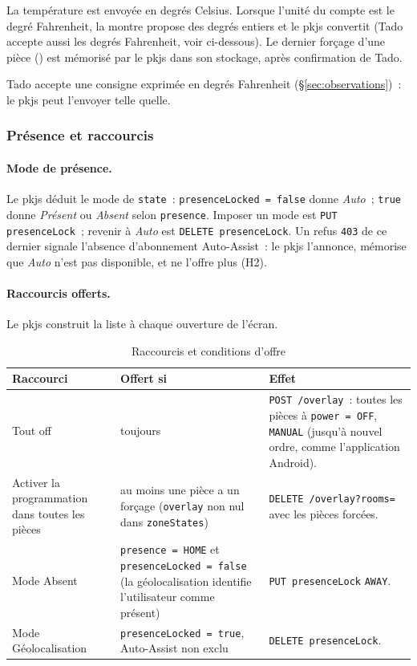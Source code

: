 La température est envoyée en degrés Celsius. Lorsque l'unité du compte est le degré
Fahrenheit, la montre propose des degrés entiers et le pkjs convertit (Tado accepte aussi les degrés Fahrenheit, voir ci-dessous). Le dernier forçage d'une pièce () est mémorisé par le pkjs
dans son stockage, après confirmation de Tado.

Tado accepte une consigne exprimée en degrés Fahrenheit (§\ref{sec:observations})~: le pkjs peut l'envoyer telle quelle.

\subsubsection{Présence et raccourcis}
\label{sec:presence}

\paragraph{Mode de présence.} Le pkjs déduit le mode de \texttt{state}~:
\texttt{presenceLocked = false} donne \emph{Auto}~; \texttt{true} donne \emph{Présent} ou
\emph{Absent} selon \texttt{presence}. Imposer un mode est \texttt{PUT presenceLock}~; revenir à
\emph{Auto} est \texttt{DELETE presenceLock}. Un refus \texttt{403} de ce dernier signale l'absence
d'abonnement Auto-Assist~: le pkjs l'annonce, mémorise que \emph{Auto} n'est pas
disponible, et ne l'offre plus (H2).

\paragraph{Raccourcis offerts.} Le pkjs construit la liste à chaque ouverture de l'écran.

\begin{table}[H]
  \centering\small
  \begin{tabularx}{\linewidth}{@{}>{\raggedright\arraybackslash}p{40mm}>{\raggedright\arraybackslash}p{50mm}X@{}}
    \toprule
    \textbf{Raccourci} & \textbf{Offert si} & \textbf{Effet} \\
    \midrule
    Tout off & toujours & \texttt{POST /overlay}~: toutes les pièces à \texttt{power = OFF}, \texttt{MANUAL} (jusqu'à nouvel ordre, comme l'application Android). \\
    Activer la programmation dans toutes les pièces & au moins une pièce a un forçage (\texttt{overlay} non nul dans \texttt{zoneStates}) & \texttt{DELETE /overlay?rooms=} avec les pièces forcées. \\
    Mode Absent & \texttt{presence = HOME} et \texttt{presenceLocked = false} (la géolocalisation identifie l'utilisateur comme présent) & \texttt{PUT presenceLock} \texttt{AWAY}. \\
    Mode Géolocalisation & \texttt{presenceLocked = true}, Auto-Assist non exclu & \texttt{DELETE presenceLock}. \\
    \bottomrule
  \end{tabularx}
  \caption{Raccourcis et conditions d'offre}
\end{table}

